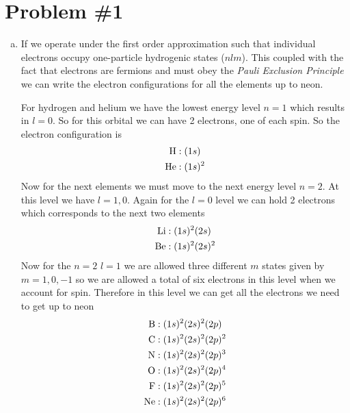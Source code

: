 \documentclass[11pt]{article}
\numberwithin{equation}{section}
\begin{document}


\section{Problem \#1}
\begin{enumerate}[(a)]
\item
If we operate under the first order approximation such that individual electrons occupy one-particle hydrogenic states ($nlm$). This coupled with the fact that electrons are fermions and must obey the \emph{Pauli Exclusion Principle} we can write the electron configurations for all the elements up to neon.

For hydrogen and helium we have the lowest energy level $n=1$ which results in $l=0$. So for this orbital we can have 2 electrons, one of each spin. So the electron configuration is
\begin{align*}
\textnormal{H} &: (1s)\\
\textnormal{He} &: (1s)^2
\end{align*}
Now for the next elements we must move to the next energy level $n=2$. At this level we have $l=1,0$. Again for the $l=0$ level we can hold 2 electrons which corresponds to the next two elements
\begin{align*}
\textnormal{Li} &: (1s)^2(2s)\\
\textnormal{Be} &: (1s)^2(2s)^2
\end{align*}
Now for the $n=2$ $l=1$ we are allowed three different $m$ states given by $m=1,0,-1$ so we are allowed a total of six electrons in this level when we account for spin. Therefore in this level we can get all the electrons we need to get up to neon
\begin{align*}
\textnormal{B} &: (1s)^2(2s)^2(2p)\\
\textnormal{C} &: (1s)^2(2s)^2(2p)^2\\
\textnormal{N} &: (1s)^2(2s)^2(2p)^3\\
\textnormal{O} &: (1s)^2(2s)^2(2p)^4\\
\textnormal{F} &: (1s)^2(2s)^2(2p)^5\\
\textnormal{Ne} &: (1s)^2(2s)^2(2p)^6
\end{align*}


\end{enumerate}
\end{document}
